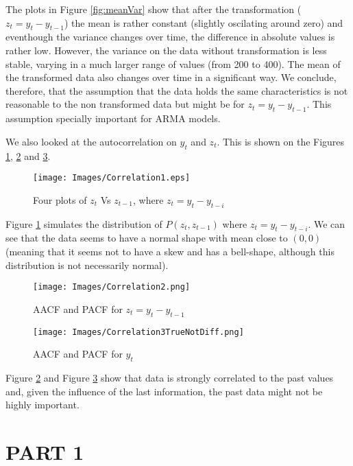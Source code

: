 The plots in Figure \ref{fig:meanVar} show that after the transformation ($z_t = y_t - y_{t-1}$)
the mean is rather constant (slightly oscilating around zero) and eventhough the variance changes over time,
the difference in absolute values is rather low.
However, the variance on the data without transformation is less stable,
varying in a much larger range of
values (from 200 to 400). The mean of the transformed data also changes over time in a significant way. We 
conclude, therefore, that the assumption that the data holds the same characteristics is not reasonable to the 
non transformed data but might be for $z_t = y_t - y_{t-1}$. This assumption specially important for ARMA models.

We also looked at the autocorrelation on $y_t$ and $z_t$.
This is shown on the Figures \ref{fig:ShiftPlot}, \ref{fig:cor1} and \ref{fig:cor2}.

\begin{figure}[!ht]
	\centering
	\texttt{[image: Images/Correlation1.eps]}
	\caption{Four plots of $z_t$ Vs $z_{t-1}$, where $z_t = y_t - y_{t-i} $}
	\label{fig:ShiftPlot}
\end{figure}

Figure \ref{fig:ShiftPlot} simulates the distribution of $P(z_t,z_{t-1})$ where $z_t = y_t - y_{t-i}$. 
We can see that the data seems to have a normal shape with mean close to $(0,0)$ 
(meaning that it seems not to have a skew and has a bell-shape, although this distribution is not necessarily normal).

\begin{figure}[!ht]
	\centering
	\texttt{[image: Images/Correlation2.png]}
	\caption{AACF and PACF for $z_t = y_t - y_{t-1} $}
	\label{fig:cor1}
\end{figure}

\begin{figure}[!ht]
	\centering
	\texttt{[image: Images/Correlation3TrueNotDiff.png]}
        \caption{AACF and PACF for $y_t$}
       	\label{fig:cor2}
\end{figure}

Figure \ref{fig:cor1} and Figure \ref{fig:cor2} show that data is strongly correlated to the past values and, 
given the influence of the last information, the past data might not be highly important. 



\section{PART 1}

